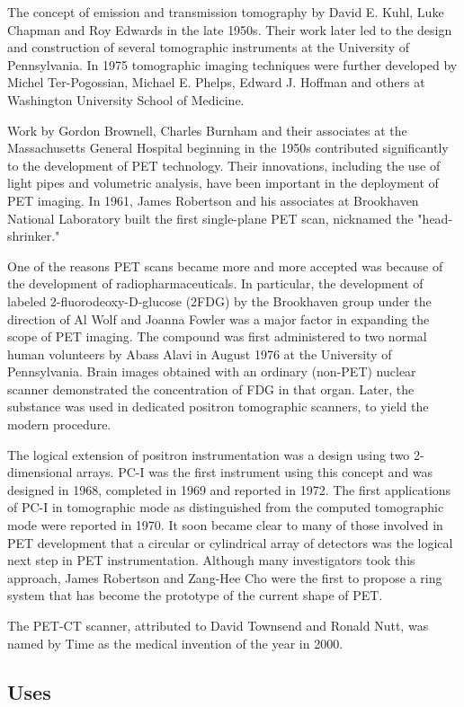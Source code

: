 \documentclass[11pt]{article}
\begin{document}
The concept of emission and transmission tomography by David E. Kuhl, Luke Chapman and Roy Edwards in the late 1950s. Their work later led to the design and construction of several tomographic instruments at the University of Pennsylvania. In 1975 tomographic imaging techniques were further developed by Michel Ter-Pogossian, Michael E. Phelps, Edward J. Hoffman and others at Washington University School of Medicine.

Work by Gordon Brownell, Charles Burnham and their associates at the Massachusetts General Hospital beginning in the 1950s contributed significantly to the development of PET technology. Their innovations, including the use of light pipes and volumetric analysis, have been important in the deployment of PET imaging. In 1961, James Robertson and his associates at Brookhaven National Laboratory built the first single-plane PET scan, nicknamed the "head-shrinker."

One of the reasons PET scans became more and more accepted was because of the development of radiopharmaceuticals. In particular, the development of labeled 2-fluorodeoxy-D-glucose (2FDG) by the Brookhaven group under the direction of Al Wolf and Joanna Fowler was a major factor in expanding the scope of PET imaging. The compound was first administered to two normal human volunteers by Abass Alavi in August 1976 at the University of Pennsylvania. Brain images obtained with an ordinary (non-PET) nuclear scanner demonstrated the concentration of FDG in that organ. Later, the substance was used in dedicated positron tomographic scanners, to yield the modern procedure.

The logical extension of positron instrumentation was a design using two 2-dimensional arrays. PC-I was the first instrument using this concept and was designed in 1968, completed in 1969 and reported in 1972. The first applications of PC-I in tomographic mode as distinguished from the computed tomographic mode were reported in 1970. It soon became clear to many of those involved in PET development that a circular or cylindrical array of detectors was the logical next step in PET instrumentation. Although many investigators took this approach, James Robertson and Zang-Hee Cho were the first to propose a ring system that has become the prototype of the current shape of PET.

The PET-CT scanner, attributed to David Townsend and Ronald Nutt, was named by Time as the medical invention of the year in 2000.

\subsection*{Uses}
\end{document}
